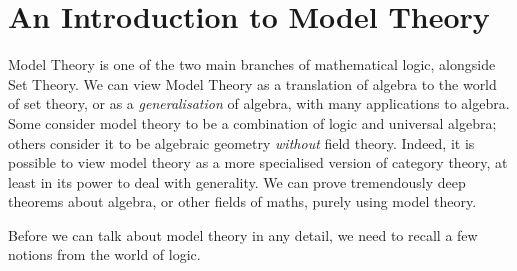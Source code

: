 \chapter{An Introduction to Model Theory} \label{Ch1:CH}
\thispagestyle{empty}

Model Theory is one of the two main branches of mathematical logic, alongside Set Theory. We can view Model Theory as a translation of algebra to the world of set theory, or as a \textit{generalisation} of algebra, with many applications to algebra. Some consider model theory to be a combination of logic and universal algebra; others consider it to be algebraic geometry \textit{without} field theory. Indeed, it is possible to view model theory as a more specialised version of category theory, at least in its power to deal with generality. We can prove tremendously deep theorems about algebra, or other fields of maths, purely using model theory.


Before we can talk about model theory in any detail, we need to recall a few notions from the world of logic.




